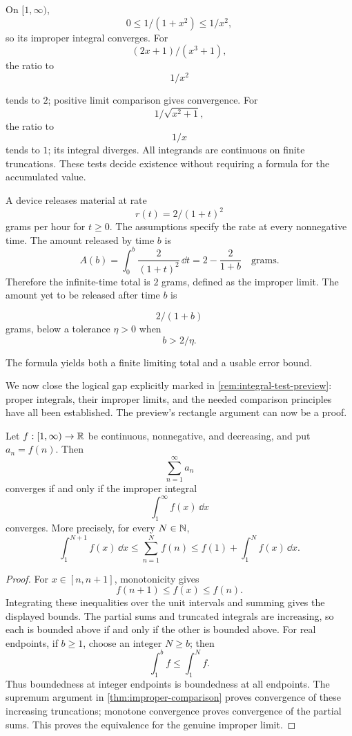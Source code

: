 \begin{example}
On $[1,\infty)$,
\[
0\leq1/(1+x^2)\leq1/x^2,
\]
 so its improper
integral converges. For
\[
(2x+1)/(x^3+1),
\]
 the ratio to
\[
1/x^2
\]

tends to $2$; positive limit comparison gives convergence.
For
\[
1/\sqrt{x^2+1},
\]
 the ratio to
\[
1/x
\]
 tends to $1$;
its integral diverges. All integrands are continuous on finite
truncations. These tests decide existence without requiring a formula
for the accumulated value.
\end{example}

\begin{example}
A device releases material at rate
\[
r(t)=2/(1+t)^2
\]
 grams per hour
for $t\geq0$. The assumptions specify the rate at every nonnegative
time. The amount released by time $b$ is
\[
A(b)=\int_0^b\frac{2}{(1+t)^2}\,\dd t
=2-\frac{2}{1+b}\quad\text{grams}.
\]
Therefore the infinite-time total is $2$ grams, defined as the
improper limit. The amount yet to be released after time $b$ is

\[
2/(1+b)
\]
 grams, below a tolerance $\eta>0$ when
\[
b>2/\eta.
\]

The formula yields both a finite limiting total and a usable error bound.
\end{example}

We now close the logical gap explicitly marked in
\cref{rem:integral-test-preview}: proper integrals, their improper
limits, and the needed comparison principles have all been established.
The preview's rectangle argument can now be a proof.

\begin{theorem}
\label{thm:integral-test}
Let $f:[1,\infty)\to\mathbb{R}$ be continuous, nonnegative, and decreasing, and put $a_n=f(n)$. Then
\[
\sum_{n=1}^{\infty}a_n
\]
converges if and only if the improper integral
\[
\int_1^{\infty}f(x)\,\dd x
\]
converges. More precisely, for every $N\in\mathbb{N}$,
\[
\int_1^{N+1}f(x)\,\dd x
\leq\sum_{n=1}^{N}f(n)
\leq f(1)+\int_1^{N}f(x)\,\dd x.
\]
\end{theorem}
\begin{proof}
For $x\in[n,n+1]$, monotonicity gives
\[
f(n+1)\leq f(x)\leq f(n).
\]
Integrating these inequalities over the unit intervals and summing gives the displayed bounds. The partial sums and truncated integrals are increasing, so each is bounded above if and only if the other is bounded above. For real endpoints, if $b\geq1$, choose an integer $N\geq b$;
then
\[
\int_1^b f\leq\int_1^N f.
\]
 Thus boundedness at integer
endpoints is boundedness at all endpoints. The supremum argument in
\cref{thm:improper-comparison} proves convergence of these increasing
truncations; monotone convergence proves convergence of the partial sums.
This proves the equivalence for the genuine improper limit.
\end{proof}

